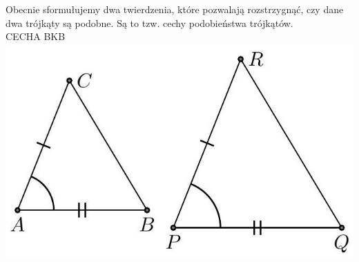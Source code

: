 \documentclass[10pt]{article}
\begin{document}
Obecnie sformułujemy dwa twierdzenia, które pozwalają rozstrzygnąć, czy dane dwa trójkąty są podobne. Są to tzw. cechy podobieństwa trójkątów.\\
CECHA BKB\\
\includegraphics[max width=\textwidth, center]{2024_11_21_e9b4faa005d5be2cc318g-023(1)}
\end{document}
